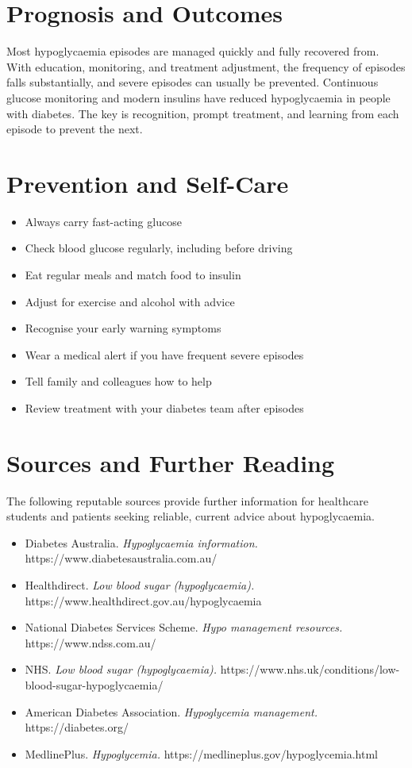 \section*{Prognosis and Outcomes}
Most hypoglycaemia episodes are managed quickly and fully recovered from. With education, monitoring, and treatment adjustment, the frequency of episodes falls substantially, and severe episodes can usually be prevented. Continuous glucose monitoring and modern insulins have reduced hypoglycaemia in people with diabetes. The key is recognition, prompt treatment, and learning from each episode to prevent the next.

\section*{Prevention and Self-Care}
\begin{itemize}
    \item Always carry fast-acting glucose
    \item Check blood glucose regularly, including before driving
    \item Eat regular meals and match food to insulin
    \item Adjust for exercise and alcohol with advice
    \item Recognise your early warning symptoms
    \item Wear a medical alert if you have frequent severe episodes
    \item Tell family and colleagues how to help
    \item Review treatment with your diabetes team after episodes
\end{itemize}

\section*{Sources and Further Reading}
The following reputable sources provide further information for healthcare students and patients seeking reliable, current advice about hypoglycaemia.

\begin{itemize}
    \item Diabetes Australia. \textit{Hypoglycaemia information.} https://www.diabetesaustralia.com.au/
    \item Healthdirect. \textit{Low blood sugar (hypoglycaemia).} https://www.healthdirect.gov.au/hypoglycaemia
    \item National Diabetes Services Scheme. \textit{Hypo management resources.} https://www.ndss.com.au/
    \item NHS. \textit{Low blood sugar (hypoglycaemia).} https://www.nhs.uk/conditions/low-blood-sugar-hypoglycaemia/
    \item American Diabetes Association. \textit{Hypoglycemia management.} https://diabetes.org/
    \item MedlinePlus. \textit{Hypoglycemia.} https://medlineplus.gov/hypoglycemia.html
\end{itemize}
